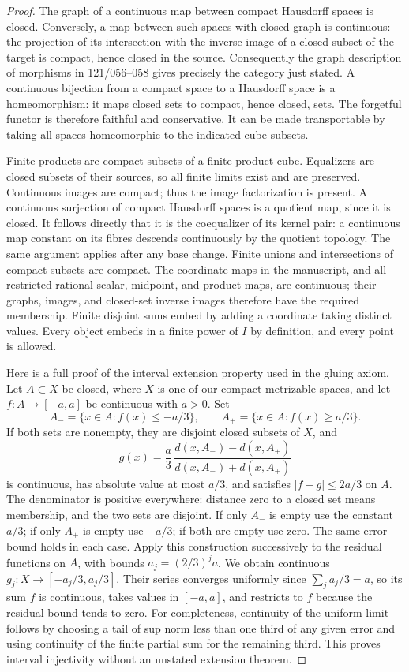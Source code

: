 \begin{proof}
The graph of a continuous map between compact Hausdorff spaces is
closed. Conversely, a map between such spaces with closed graph
is continuous: the projection of its intersection with the inverse
image of a closed subset of the target is compact, hence closed
in the source. Consequently the graph description of morphisms
in 121/056--058 gives precisely the category just stated.
A continuous bijection from a compact space to a Hausdorff space
is a homeomorphism: it maps closed sets to compact, hence closed,
sets. The forgetful functor is therefore faithful and conservative.
It can be made transportable by taking all spaces homeomorphic
to the indicated cube subsets.

Finite products are compact subsets of a finite product cube.
Equalizers are closed subsets of their sources, so all finite
limits exist and are preserved. Continuous images are compact;
thus the image factorization is present. A continuous surjection
of compact Hausdorff spaces is a quotient map, since it is closed.
It follows directly that it is the coequalizer of its kernel pair:
a continuous map constant on its fibres descends continuously
by the quotient topology. The same argument applies after any
base change. Finite unions and intersections of compact subsets
are compact. The coordinate maps in the manuscript, and all
restricted rational scalar, midpoint, and product maps, are
continuous; their graphs, images, and closed-set inverse images
therefore have the required membership. Finite disjoint sums
embed by adding a coordinate taking distinct values. Every object
embeds in a finite power of $I$ by definition, and every point
is allowed.

Here is a full proof of the interval extension property used in
the gluing axiom. Let $A\subset X$ be closed, where $X$ is one
of our compact metrizable spaces, and let $f:A\to[-a,a]$ be
continuous with $a>0$. Set
\[
 A_- =\{x\in A:f(x)\leq-a/3\},\qquad
 A_+ =\{x\in A:f(x)\geq a/3\}.
\]
If both sets are nonempty, they are disjoint closed subsets of
$X$, and
\[
 g(x)=\frac a3\,
 \frac{d(x,A_-)-d(x,A_+)}{d(x,A_-)+d(x,A_+)}
\]
is continuous, has absolute value at most $a/3$, and satisfies
$|f-g|\leq2a/3$ on $A$. The denominator is positive everywhere:
distance zero to a closed set means membership, and the two
sets are disjoint. If only $A_-$ is empty use the constant
$a/3$; if only $A_+$ is empty use $-a/3$; if both are empty
use zero. The same error bound holds in each case.
Apply this construction successively to the residual functions
on $A$, with bounds $a_j=(2/3)^ja$. We obtain continuous
$g_j:X\to[-a_j/3,a_j/3]$. Their series converges uniformly
since $\sum_j a_j/3=a$, so its sum $\bar f$ is continuous,
takes values in $[-a,a]$, and restricts to $f$ because the
residual bound tends to zero. For completeness, continuity of
the uniform limit follows by choosing a tail of sup norm less
than one third of any given error and using continuity of the
finite partial sum for the remaining third. This proves
interval injectivity without an unstated extension theorem.


\end{proof}
